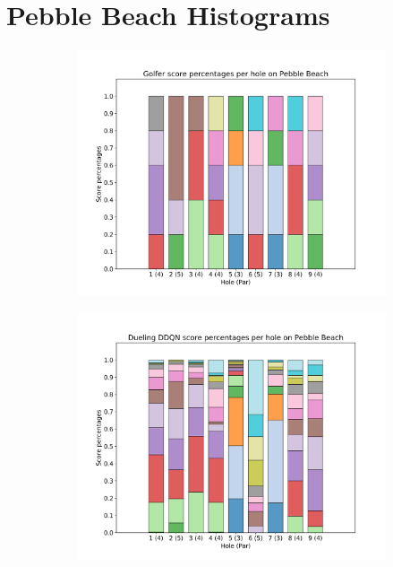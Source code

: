 \documentclass{kththesis}
\begin{document}
\chapter{Pebble Beach Histograms}
\label{app:pebble_histograms}
\begin{figure}
    \centering
    \begin{subfigure}{\textwidth}
    \centering
    \includegraphics[height=0.3\textheight]{L2Percentages/L2_Score_Percentages_Pebble.png} 
    \end{subfigure}
    \begin{subfigure}{\textwidth}
    \centering
    \includegraphics[height=0.3\textheight]{AgentPercentages/DDDQN_Score_Percentages_Pebble.png} 

\end{subfigure}
\end{figure}
\end{document}
